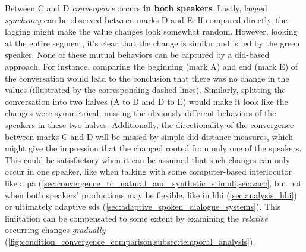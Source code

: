 Between C and D \emph{convergence} occurs \textbf{in both speakers}.
Lastly, lagged \emph{synchrony} can be observed between marks D and E.
If compared directly, the lagging might make the value changes look somewhat random.
However, looking at the entire segment, it's clear that the change is similar and is led by the green speaker.
None of these mutual behaviors can be captured by a \ac{did}-based approach.
For instance, comparing the beginning (mark A) and end (mark E) of the conversation would lead to the conclusion that there was no change in the values (illustrated by the corresponding dashed lines).
Similarly, splitting the conversation into two halves (A to D and D to E) would make it look like the changes were symmetrical, missing the obviously different behaviors of the speakers in these two halves.
Additionally, the directionality of the convergence between marks C and D will be missed by simple \ac{did} distance measures, which might give the impression that the changed rooted from only one of the speakers.
This could be satisfactory when it can be assumed that such changes can only occur in one speaker, like when talking with some computer-based interlocutor like a \ac{pa} (\cref{sec:convergence_to_natural_and_synthetic_stimuli,sec:vacc}, but not when both speakers' productions may be flexible, like in \ac{hhi} (\cref{sec:analysis_hhi}) or ultimately adaptive \acl{sds} (\cref{sec:adaptive_spoken_dialogue_systems}).
This limitation can be compensated to some extent by examining the \emph{relative} occurring changes \emph{gradually} (\cref{fig:condition_convergence_comparison,subsec:temporal_analysis}).


